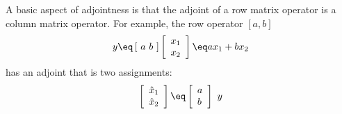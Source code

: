 \par
A basic aspect of adjointness is that the
adjoint of a row matrix operator is a column matrix operator.
For example,
the row operator $[a,b]$
\begin{equation}
y \eq
\left[ \ a \ b \ \right] 
\left[
\begin{array}{l}
	x_1 \\
	x_2
\end{array}
\right] 
\eq
a x_1 + b x_2
\end{equation}
has an adjoint that is two assignments:
\begin{equation}
	\left[
	\begin{array}{l}
		\hat x_1 \\
		\hat x_2
	\end{array}
	\right]
	\eq
	\left[
	\begin{array}{l}
		a \\
		b
	\end{array}
	\right]
	\ y
\end{equation}
\par
{}

